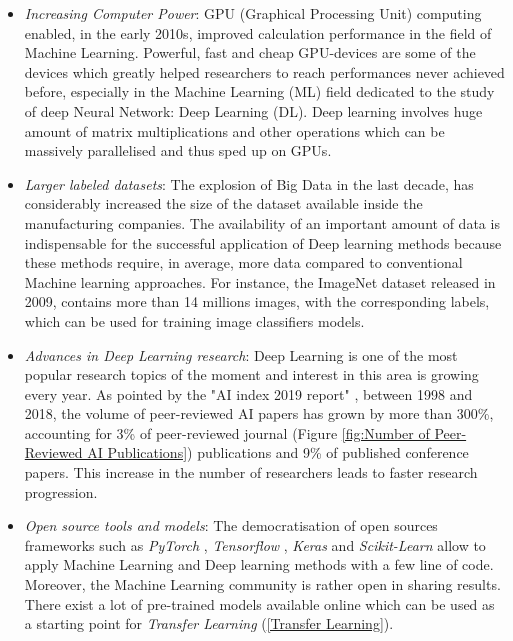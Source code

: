 \begin{itemize}
    \item \emph{Increasing Computer Power}: GPU (Graphical Processing Unit) computing enabled, in the early 2010s, improved calculation performance in the field of Machine Learning. Powerful, fast and cheap GPU-devices are some of the devices which greatly helped researchers to reach performances never achieved before, especially in the Machine Learning (ML) field dedicated to the study of deep Neural Network: Deep Learning (DL). Deep learning involves huge amount of matrix multiplications and other operations which can be massively parallelised and thus sped up on GPUs.
    \item \emph{Larger labeled datasets}: The explosion of Big Data in the last decade, has considerably increased the size of the dataset available inside the manufacturing companies. The availability of an important amount of data is indispensable for the successful application of Deep learning methods because these methods require, in average, more data compared to conventional Machine learning approaches. For instance, the ImageNet dataset \citep{deng2009imagenet} released in 2009, contains more than 14 millions images, with the corresponding labels, which can be used for training image classifiers models.
    \item \emph{Advances in Deep Learning research}: Deep Learning is one of the most popular research topics of the moment and interest in this area is growing every year. As pointed by the "AI index 2019 report" \citep{zhang2021ai}, between 1998 and 2018, the volume of peer-reviewed AI papers has grown by more than 300\%, accounting for 3\% of peer-reviewed journal (Figure \ref{fig:Number of Peer-Reviewed AI Publications}) publications and 9\% of published conference papers. This increase in the number of researchers leads to faster research progression. 
    \item \emph{Open source tools and models}: The democratisation of open sources frameworks such as \textit{PyTorch} \citep{paszke2019pytorch}, \textit{Tensorflow} \citep{tensorflow2015-whitepaper}, \textit{Keras} \citep{chollet2015keras} and \textit{Scikit-Learn} \citep{scikit-learn} allow to apply Machine Learning and Deep learning methods with a few line of code. Moreover, the Machine Learning community is rather open in sharing results. There exist a lot of pre-trained models available online which can be used as a starting point for \textit{Transfer Learning} (\ref{Transfer Learning}).  
\end{itemize}

